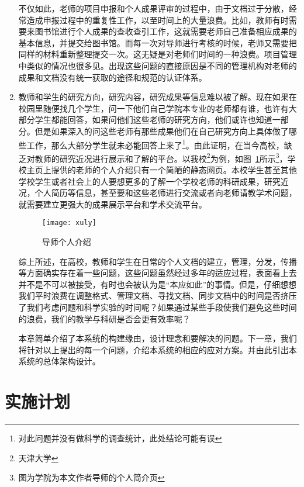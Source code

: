 \begin{enumerate}
不仅如此，老师的项目申报和个人成果评审的过程中，由于文档过于分散，经常造成申报过程中的重复性工作，以至时间上的大量浪费。比如，教师有时需要来图书馆进行个人成果的查收查引工作，这就需要老师自己准备相应成果的基本信息，并提交给图书馆。而每一次对导师进行考核的时候，老师又需要把同样的材料重新整理提交一次。这无疑是对老师们时间的一种浪费。项目管理中类似的情况也很多见。出现这些问题的直接原因是不同的管理机构对老师的成果和文档没有统一获取的途径和规范的认证体系。
\item 教师和学生的研究方向，研究内容，研究成果等信息难以被了解。现在如果在校园里随便找几个学生，问一下他们自己学院本专业的老师都有谁，也许有大部分学生都能回答，如果问他们这些老师的研究方向，他们或许也知道一部分。但是如果深入的问这些老师有那些成果他们在自己研究方向上具体做了哪些工作，那么大部分学生就未必能回答上来了\footnote{对此问题并没有做科学的调查统计，此处结论可能有误}。由此证明，在当今高校，缺乏对教师的研究近况进行展示和了解的平台。以我校\footnote{天津大学}为例，如图~\ref{fig:xfig1}所示\footnote{图为学院为本文作者导师的个人简介页}，学校主页上提供的老师的个人介绍只有一个简陋的静态网页。本校学生甚至其他学校学生或者社会上的人要想更多的了解一个学校老师的科研成果，研究近况，个人简历等信息，甚至要和这些老师进行交流或者向老师请教学术问题，就需要建立更强大的成果展示平台和学术交流平台。
\begin{figure}[H] 
  \centering
  \texttt{[image: xuly]}
  \caption{导师个人介绍}
  \label{fig:xfig1}
\end{figure}
综上所述，在高校，教师和学生在日常的个人文档的建立，管理，分发，传播等方面确实存在着一些问题，这些问题虽然经过多年的适应过程，表面看上去并不是不可以被接受，有时也会被认为是“本应如此”的事情。但是，仔细想想我们平时浪费在调整格式、管理文档、寻找文档、同步文档中的时间是否挤压了我们考虑问题和科学实验的时间呢？如果通过某些手段使我们避免这些时间的浪费，我们的教学与科研是否会更有效率呢？

本章简单介绍了本系统的构建缘由，设计理念和要解决的问题。下一章，我们将针对以上提出的每一个问题，介绍本系统的相应的应对方案。并由此引出本系统的总体架构设计。
\end{enumerate}

\section{实施计划}
\label{sec:task}

